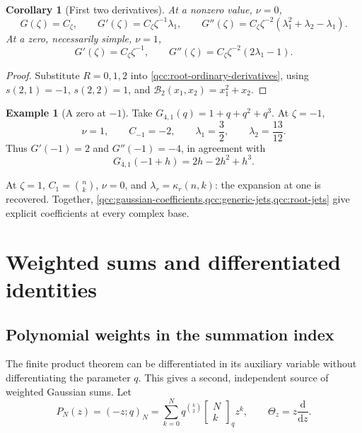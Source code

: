 \documentclass[11pt,a4paper,oneside,openany]{book}
\newtheorem{corollary}[theorem]{Corollary}
\theoremstyle{definition}
\newtheorem{example}[theorem]{Example}
\theoremstyle{remark}
\newcommand{\GB}[3][q]{\begin{bmatrix}#2\\#3\end{bmatrix}_{#1}}
\newcommand{\Y}[1]{\mathcal B_{#1}}
\begin{document}
\begin{corollary}[First two derivatives]\label{qcc:root-low-jets}
At a nonzero value, \(\nu=0\),
\[
 G(\zeta)=C_\zeta,\qquad
 G'(\zeta)=C_\zeta\zeta^{-1}\lambda_1,\qquad
 G''(\zeta)=C_\zeta\zeta^{-2}
             (\lambda_1^2+\lambda_2-\lambda_1).
\]
At a zero, necessarily simple, \(\nu=1\),
\[
 G'(\zeta)=C_\zeta\zeta^{-1},\qquad
 G''(\zeta)=C_\zeta\zeta^{-2}(2\lambda_1-1).
\]
\end{corollary}
\begin{proof}
Substitute \(R=0,1,2\) into
\eqref{qcc:root-ordinary-derivatives}, using
\(s(2,1)=-1\), \(s(2,2)=1\), and
\(\Y2(x_1,x_2)=x_1^2+x_2\).
\end{proof}

\begin{example}[A zero at \(-1\)]
Take \(G_{4,1}(q)=1+q+q^2+q^3\). At \(\zeta=-1\),
\[
 \nu=1,\qquad C_{-1}=-2,\qquad
 \lambda_1=\frac32,\qquad\lambda_2=\frac{13}{12}.
\]
Thus \(G'(-1)=2\) and \(G''(-1)=-4\), in agreement with
\[
 G_{4,1}(-1+h)=2h-2h^2+h^3.
\]
\end{example}

At \(\zeta=1\), \(C_1=\binom nk\), \(\nu=0\), and
\(\lambda_r=\kappa_r(n,k)\): the expansion at one is recovered. Together,
\cref{qcc:gaussian-coefficients,qcc:generic-jets,qcc:root-jets} give explicit
coefficients at every complex base.

\chapter{Weighted sums and differentiated identities}
\label{qcc:weighted-sums}
\section{Polynomial weights in the summation index}
The finite product theorem can be differentiated in its auxiliary variable
without differentiating the parameter \(q\). This gives a second, independent
source of weighted Gaussian sums. Let
\[
 P_N(z)=(-z;q)_N
   =\sum_{k=0}^{N}q^{\binom k2}\GB Nk z^k,
 \qquad \Theta_z=z\frac{\mathrm d}{\mathrm dz}.
\]
\end{document}
